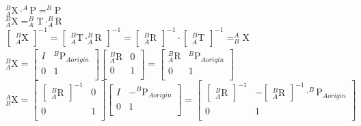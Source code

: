\documentclass[document]{standalone}
\begin{document}
\begin{preview}
\Large

${\displaystyle _{A}^{B}\textrm{X} \cdot _{}^{A}\textrm{P}= _{}^{B}\textrm{P}}$\\
${\displaystyle _{A}^{B}\textrm{X}=_{A}^{B}\textrm{T} \cdot _{A}^{B}\textrm{R}}$\\
${\displaystyle \begin{bmatrix}_{A}^{B}\textrm{X}\end{bmatrix}_{}^{-1}=\begin{bmatrix}_{A}^{B}\textrm{T} \cdot _{A}^{B}\textrm{R}\end{bmatrix}_{}^{-1}=\begin{bmatrix}_{A}^{B}\textrm{R}\end{bmatrix}_{}^{-1} \cdot \begin{bmatrix}_{A}^{B}\textrm{T}\end{bmatrix}_{}^{-1}=_{B}^{A}\textrm{X}}$\\
${\displaystyle _{A}^{B}\textrm{X} =\begin{bmatrix}
I & _{}^{B}\textrm{P}_{A origin}^{} \\
0 & 1 \\
\end{bmatrix}\begin{bmatrix}
_{A}^{B}\textrm{R} & 0 \\
0 & 1 \\
\end{bmatrix}=\begin{bmatrix}
_{A}^{B}\textrm{R} & _{}^{B}\textrm{P}_{A origin}^{} \\
0 & 1 \\
\end{bmatrix}}$ \\
${\displaystyle _{B}^{A}\textrm{X}=\begin{bmatrix}
\begin{bmatrix}
_{A}^{B}\textrm{R}\end{bmatrix}_{}^{-1} &  0\\
0 & 1 \\
\end{bmatrix}\begin{bmatrix}
I & -_{}^{B}\textrm{P}_{A origin}^{} \\
0 & 1 \\
\end{bmatrix}=\begin{bmatrix}
\begin{bmatrix}
_{A}^{B}\textrm{R}\end{bmatrix}_{}^{-1} & -\begin{bmatrix}
_{A}^{B}\textrm{R}\end{bmatrix}_{}^{-1} \cdot _{}^{B}\textrm{P}_{A origin}^{}\\
0 & 1 \\
\end{bmatrix}}
$
\end{preview}
\end{document}
